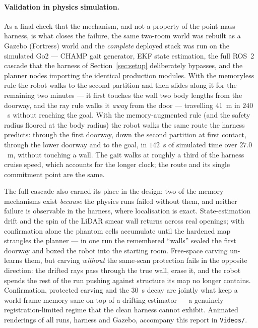 \documentclass[11pt,a4paper]{article}
\begin{document}
\paragraph{Validation in physics simulation.} As a final check that the mechanism, and not a property of
the point-mass harness, is what closes the failure, the same two-room world was rebuilt as a Gazebo
(Fortress) world and the \emph{complete} deployed stack was run on the simulated Go2 --- CHAMP gait
generator, EKF state estimation, the full ROS~2 cascade that the harness of Section~\ref{sec:setup}
deliberately bypasses, and the planner nodes importing the identical production modules. With the
memoryless rule the robot walks to the second partition and then slides along it for the remaining two
minutes --- it first touches the wall two body lengths from the doorway, and the ray rule walks it
\emph{away} from the door --- travelling $41$~m in $240$~s without reaching the goal. With the
memory-augmented rule (and the safety radius floored at the body radius) the robot walks the same route the
harness predicts: through the first doorway, down the second partition at first contact, through the lower
doorway and to the goal, in $142$~s of simulated time over $27.0$~m, without touching a wall. The gait
walks at roughly a third of the harness cruise speed, which accounts for the longer clock; the route and
its single commitment point are the same.

The full cascade also earned its place in the design: two of the memory mechanisms exist \emph{because} the
physics runs failed without them, and neither failure is observable in the harness, where localisation is
exact. State-estimation drift and the spin of the LiDAR smear wall returns across real openings; with
confirmation alone the phantom cells accumulate until the hardened map strangles the planner --- in one run
the remembered ``walls'' sealed the first doorway and boxed the robot into the starting room. Free-space
carving un-learns them, but carving \emph{without} the same-scan protection fails in the opposite
direction: the drifted rays pass through the true wall, erase it, and the robot spends the rest of the run
pushing against structure its map no longer contains. Confirmation, protected carving and the $30$~s decay
are jointly what keep a world-frame memory sane on top of a drifting estimator --- a genuinely
registration-limited regime that the clean harness cannot exhibit. Animated renderings of all runs, harness
and Gazebo, accompany this report in \texttt{Videos/}.
\end{document}
